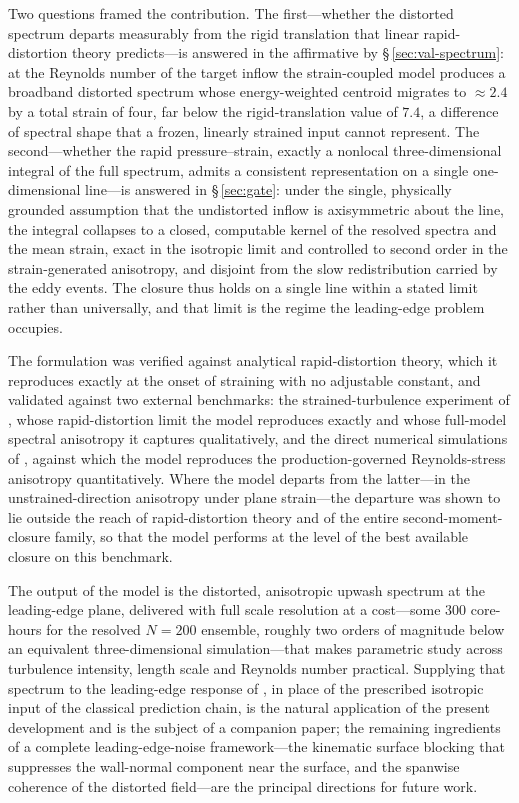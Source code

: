 \documentclass[lineno]{JFM-FLM_Au}
\newcounter{assumption}
\begin{document}
Two questions framed the contribution. The first---whether the distorted
spectrum departs measurably from the rigid translation that linear
rapid-distortion theory predicts---is answered in the affirmative by
\S\,\ref{sec:val-spectrum}: at the Reynolds number of the target inflow the
strain-coupled model produces a broadband distorted spectrum whose
energy-weighted centroid migrates to $\approx2.4$ by a total strain of four,
far below the rigid-translation value of $7.4$, a difference of spectral shape
that a frozen, linearly strained input cannot represent. The second---whether
the rapid pressure--strain, exactly a nonlocal three-dimensional integral of
the full spectrum, admits a consistent representation on a single
one-dimensional line---is answered in \S\,\ref{sec:gate}: under the single,
physically grounded assumption that the undistorted inflow is axisymmetric
about the line, the integral collapses to a closed, computable kernel of the
resolved spectra and the mean strain, exact in the isotropic limit and
controlled to second order in the strain-generated anisotropy, and disjoint
from the slow redistribution carried by the eddy events. The closure thus
holds on a single line within a stated limit rather than universally, and that
limit is the regime the leading-edge problem occupies.

The formulation was verified against analytical rapid-distortion theory, which
it reproduces exactly at the onset of straining with no adjustable constant,
and validated against two external benchmarks: the strained-turbulence
experiment of \citet{ChenMeneveauKatz2006}, whose rapid-distortion limit the
model reproduces exactly and whose full-model spectral anisotropy it captures
qualitatively, and the direct numerical simulations of \citet{LeeReynolds1985},
against which the model reproduces the production-governed Reynolds-stress
anisotropy quantitatively. Where the model departs from the latter---in the
unstrained-direction anisotropy under plane strain---the departure was shown to
lie outside the reach of rapid-distortion theory and of the entire
second-moment-closure family, so that the model performs at the level of the
best available closure on this benchmark.

The output of the model is the distorted, anisotropic upwash spectrum at the
leading-edge plane, delivered with full scale resolution at a cost---some $300$
core-hours for the resolved $N=200$ ensemble, roughly two orders of magnitude
below an equivalent three-dimensional simulation---that makes parametric study
across turbulence intensity, length scale and Reynolds number practical.
Supplying that
spectrum to the leading-edge response of \citet{Amiet1975}, in place of the
prescribed isotropic input of the classical prediction chain, is the natural
application of the present development and is the subject of a companion paper;
the remaining ingredients of a complete leading-edge-noise framework---the
kinematic surface blocking that suppresses the wall-normal component near the
surface, and the spanwise coherence of the distorted field---are the principal
directions for future work.
\end{document}
